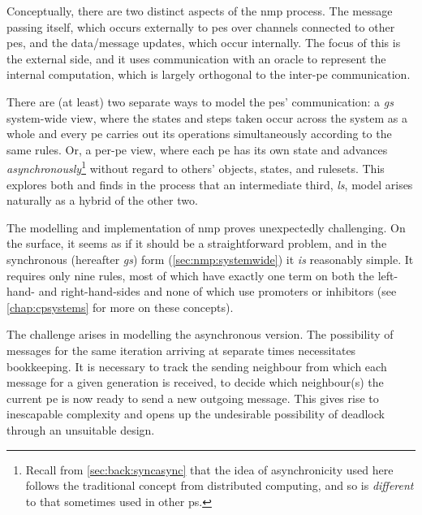 Conceptually, there are two distinct aspects of the \gls{nmp} process.  The message passing itself, which occurs externally to \glspl{pe} over channels connected to other \glspl{pe}, and the data/message updates, which occur internally.  The focus of this  is the external side, and it uses communication with an oracle to represent the internal computation, which is largely orthogonal to the inter-\gls{pe} communication.

There are (at least) two separate ways to model the \glspl{pe}' communication:  a \emph{\gls{gs}} system-wide view, where the states and steps taken occur across the system as a whole and every \gls{pe} carries out its operations simultaneously according to the same rules.  Or, a per-\gls{pe} view, where each \gls{pe} has its own state and advances \emph{asynchronously}\footnote{Recall from \vref{sec:back:syncasync} that the idea of asynchronicity used here follows the traditional concept from distributed computing, and so is \emph{different} to that sometimes used in other \gls{ps}.} without regard to others' objects, states, and rulesets.  This  explores both and finds in the process that an intermediate third, \emph{\gls{ls}}, model arises naturally as a hybrid of the other two.

The modelling and implementation of \gls{nmp} proves unexpectedly challenging.  On the surface, it seems as if it should be a straightforward problem, and in the synchronous (hereafter \emph{\gls{gs}}) form (\cref{sec:nmp:systemwide}) it \emph{is} reasonably simple.  It requires only nine rules, most of which have exactly one term on both the left-hand- and right-hand-sides and none of which use \glspl{promoter} or \glspl{inhibitor} (see \cref{chap:cpsystems} for more on these concepts).

The challenge arises in modelling the asynchronous version.  The possibility of messages for the same iteration arriving at separate times necessitates bookkeeping.  It is necessary to track the sending neighbour from which each message for a given generation is received, to decide which neighbour(s) the current \gls{pe} is now ready to send a new outgoing message.  This gives rise to inescapable complexity and opens up the undesirable possibility of deadlock through an unsuitable design.

